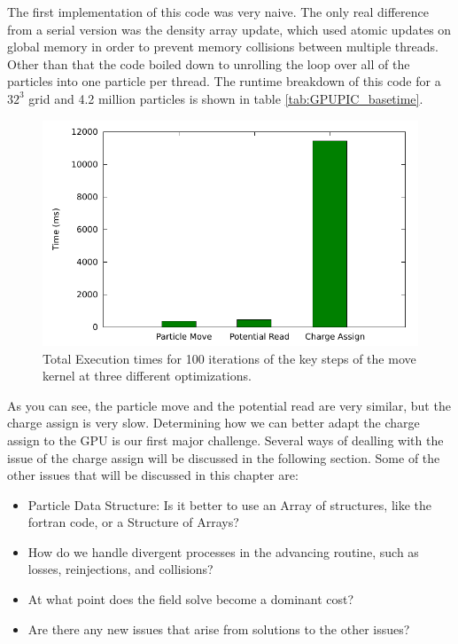 The first implementation of this code was very naive. The only real difference from a serial version was the density array update, which used atomic updates on global memory in order to prevent memory collisions between multiple threads. Other than that the code boiled down to unrolling the loop over all of the particles into one particle per thread. The runtime breakdown of this code for a $32^3$ grid and 4.2 million particles is shown in table \ref{tab:GPUPIC_basetime}.


\begin{figure}
\begin{center}
\includegraphics[width=5in]{design/sandbox_run_histo.pdf}
\end{center}
\caption{Total Execution times for 100 iterations of the key steps of the move kernel at three different optimizations.}
\label{fig:GPUPIC_basetime} 
\end{figure}



As you can see, the particle move and the potential read are very similar, but the charge assign is very slow. Determining how we can better adapt the charge assign to the GPU is our first major challenge. Several ways of dealling with the issue of the charge assign will be discussed in the following section. Some of the other issues that will be discussed in this chapter are:

\begin{itemize}\itemsep0pt \parskip0pt 
\item Particle Data Structure: Is it better to use an Array of structures, like the fortran code, or a Structure of Arrays?
\item How do we handle divergent processes in the advancing routine, such as losses, reinjections, and collisions?
\item At what point does the field solve become a dominant cost?
\item Are there any new issues that arise from solutions to the other issues?
\end{itemize}

